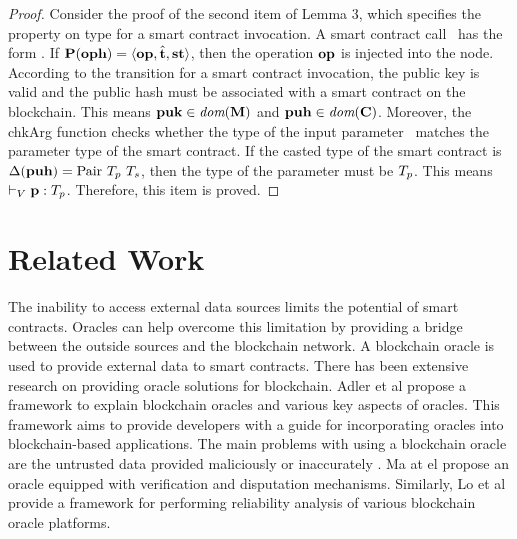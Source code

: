 \documentclass[runningheads]{llncs}
\begin{document}
\begin{proof} Consider the proof of the second item of Lemma 3, which specifies the property on type for a smart contract invocation. A smart contract call \OP\ has the form \TRANSFER [\PARAMETER]\NTEZ\PUK\PUH\MTEZ. If $\textbf{P} (\textbf{oph}) = \langle\textbf{op}, \hat{\textbf{t}}, \textbf{st} \rangle$, then the operation $\textbf{op}$ is injected into the node. According to the transition  for a smart contract invocation, the public key is valid and the public hash must be associated with a smart contract on the blockchain. This means $\textbf{puk} \in \textit{dom} (\textbf{M})$ and $\textbf{puh}\in \textit{dom} (\textbf{C})$. Moreover, the chkArg function checks whether the type of the input parameter \PARAMETER\ matches the parameter type of the smart contract. If the casted type of the smart contract is $\Delta (\PUH) =\TPAIR\ \TYPE_p\ \TYPE_s$, then the type of the parameter  must be $T_p$. This means $\vdash_V\textbf{p}:T_p$. Therefore, this item is proved.
\end{proof}

\section{Related Work}
\label{sec:related work}
The inability to access external data sources limits the potential of
smart contracts. Oracles
\cite{oracle-patterns,call-action-oracle,oracles-study} can help
overcome this limitation by providing a bridge between the outside
sources and the blockchain network. A blockchain oracle is used to
provide external data to smart contracts. There has been extensive research on providing oracle solutions for blockchain.  Adler et al
\cite{blockchain-oracles} propose a framework to explain blockchain
oracles and various key aspects of oracles. This framework aims to
provide developers with a guide for incorporating oracles into
blockchain-based applications. The main problems with using a blockchain oracle are the untrusted
data provided maliciously or inaccurately \cite{trustworthy}. Ma at el
\cite{reliable-oracle} propose an oracle equipped with 
verification and disputation mechanisms. Similarly, Lo et al
\cite{reliablity-oracles} provide a framework for performing
reliability analysis of various blockchain oracle platforms.

\end{document}
